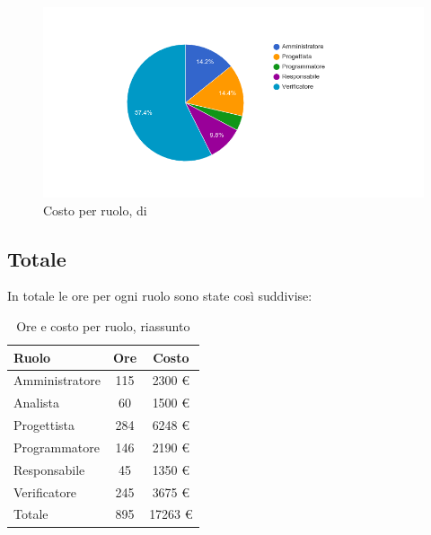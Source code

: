 \begin{figure}[H]
  \begin{center}
    \includegraphics[width=15cm]{res/img/prospettoEconomico/costoPerRuoloValidazione.png}
  \caption{Costo per ruolo,  di }
  \end{center} 
\end{figure}  


\subsection{Totale}
In totale le ore per ogni ruolo sono state così suddivise:

\begin{table}[H]
	\centering
	\begin{tabular}{ l c c }
		\textbf{Ruolo} & \textbf{Ore} & \textbf{Costo} \\
		\hline
		Amministratore & 115 & 2300 \euro{} \\
		Analista & 60 & 1500 \euro{} \\
		Progettista & 284 & 6248 \euro{} \\
		Programmatore & 146 & 2190 \euro{} \\
		Responsabile & 45 & 1350 \euro{} \\
		Verificatore & 245 & 3675 \euro{} \\
		\hline
		Totale & 895 & 17263 \euro{} \\
		\hline
	\end{tabular}
	\caption{Ore e costo per ruolo, riassunto }
\end{table}


